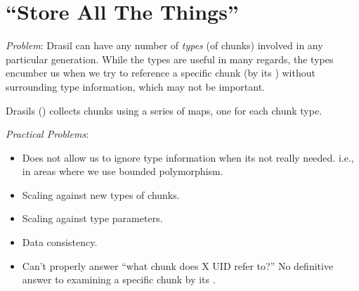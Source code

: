 \chapter{``Store All The Things''}
\label{chap:storingChunks}

\begin{writingdirectives}

      \item \textit{Problem}: Drasil can have any number of \textit{types} (of
            chunks) involved in any particular generation. While the types are
            useful in many regards, the types encumber us when we try to
            reference a specific chunk (by its \UID{}) without surrounding type
            information, which may not be important.

      \item Drasils \ChunkDB{} () collects chunks
            using a series of maps, one for each chunk type.

      \item \textit{Practical Problems}:
            \begin{itemize}

                  \item Does not allow us to ignore type information when its
                        not really needed. i.e., in areas where we use bounded
                        polymorphism.
                  

                  \item Scaling against new types of chunks.
                  
                  \item Scaling against type parameters.
                  
                  \item Data consistency.
                  
                  \item Can't properly answer ``what chunk does X UID refer
                        to?'' No definitive answer to examining a specific chunk
                        by its \UID{}.

            \end{itemize}


\end{writingdirectives}
